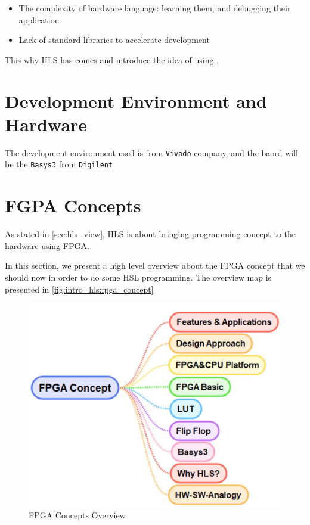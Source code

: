 \begin{itemize}

\item The complexity of hardware language: learning them, and debugging their application

\item Lack of standard libraries to accelerate development

\end{itemize}

This why HLS has comes and introduce the idea of using . 

\section{Development Environment and Hardware}

The development environment used is from \verb|Vivado| company, and the baord will be the \verb|Basys3| from \verb|Digilent|.

\newpage
\section{FGPA Concepts}

As stated in \autoref{sec:hls_view}, HLS is about bringing programming concept to the hardware using FPGA. 

In this section, we present a high level overview about the FPGA concept that we should now in order to do some HSL programming. The overview map is presented in \autoref{fig:intro_hls:fpga_concept}

\begin{figure}[h]
\centering
\includegraphics[scale=0.5,frame]{Figures/intro_hls/fpga_concept}
\caption{FPGA Concepts Overview}
\label{fig:intro_hls:fpga_concept}
\end{figure}

